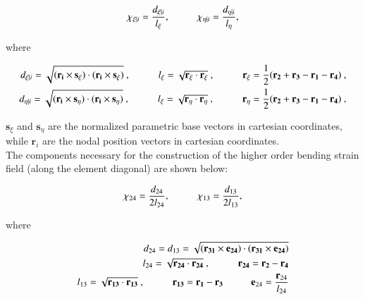 \begin{equation} 
\chi_{\xi | i} = \frac{d_{\xi | i}}{l_\xi},
\hspace{10mm}
\chi_{\eta | i} = \frac{d_{\eta | i}}{l_\eta},
\label{equation12}
\end{equation}

where

\begin{align*} 
	d_{\xi | i} = \sqrt{(\mathbf{r_i} \times \mathbf{s_\xi}) \cdot (\mathbf{r_i} \times \mathbf{s_\xi})}\ ,
	\hspace{10mm}
	l_\xi = \sqrt{\mathbf{r_\xi} \cdot \mathbf{r_\xi}}\ ,
	\hspace{10mm} 
	\mathbf{r_\xi} = \frac{1}{2} ( \mathbf{r_2} + \mathbf{r_3} - \mathbf{r_1} - \mathbf{r_4} )\ , \\
	d_{\eta | i} = \sqrt{(\mathbf{r_i} \times \mathbf{s_\eta}) \cdot (\mathbf{r_i} \times \mathbf{s_\eta})}\ ,
	\hspace{10mm}
	l_\xi = \sqrt{\mathbf{r_\eta} \cdot \mathbf{r_\eta}}\ ,
	\hspace{10mm}
	\mathbf{r_\eta} = \frac{1}{2} ( \mathbf{r_2} + \mathbf{r_3} - \mathbf{r_1} - \mathbf{r_4} )\ ,
\end{align*}


$\textbf{s}_\xi$ and $\textbf{s}_\eta$ are the normalized parametric base vectors in cartesian coordinates, while $\textbf{r}_i$ are the nodal position vectors in cartesian coordinates.\\

The components necessary for the construction of the higher order bending strain field (along the element diagonal) are shown below: 


\begin{equation} 
\chi_{24} = \frac{d_{24}}{2 l_{24}},
\hspace{10mm}
\chi_{13} = \frac{d_{13}}{2 l_{13}},
\label{equation12chi24}
\end{equation}

where

\begin{align*} 
	d_{24} = d_{13} = \sqrt{(\mathbf{r_{31}} \times \mathbf{e_{24}}) \cdot (\mathbf{r_{31}} \times \mathbf{e_{24}})} \\
	l_{24} = \sqrt{\mathbf{r_{24}} \cdot \mathbf{r_{24}}}\ ,
	\hspace{10mm}
	\mathbf{r_{24}} = \mathbf{r_2} - \mathbf{r_4} \\
	l_{13} = \sqrt{\mathbf{r_{13}} \cdot \mathbf{r_{13}}}\ ,
	\hspace{10mm}
	\mathbf{r_{13}} = \mathbf{r_1} - \mathbf{r_3}
	\hspace{10mm}
	\mathbf{e}_{24} = \frac{\mathbf{r}_{24}}{l_{24}}
\end{align*}

